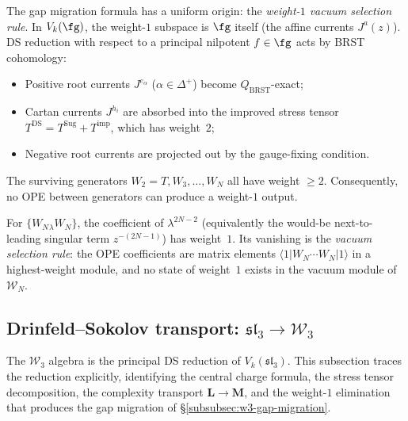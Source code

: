 \begin{remark}%
\label{rem:weight-1-vacuum-selection}%
%
%
The gap migration formula has a uniform origin: the
\emph{weight-$1$ vacuum selection rule}. In $V_k(\fg)$,
the weight-$1$ subspace is $\fg$ itself (the affine
currents $J^a(z)$). DS reduction with respect to a
principal nilpotent $f \in \fg$ acts by BRST cohomology:
\begin{itemize}
\item Positive root currents $J^{e_\alpha}$ ($\alpha \in \Delta^+$)
 become $Q_{\mathrm{BRST}}$-exact;
\item Cartan currents $J^{h_i}$ are absorbed into the
 improved stress tensor $T^{\mathrm{DS}} = T^{\mathrm{Sug}}
 + T^{\mathrm{imp}}$, which has weight~$2$;
\item Negative root currents are projected out by the
 gauge-fixing condition.
\end{itemize}
The surviving generators $W_2 = T, W_3, \ldots, W_N$
all have weight $\ge 2$. Consequently, no OPE between
generators can produce a weight-$1$ output.

For $\{W_N{}_\lambda W_N\}$, the coefficient of $\lambda^{2N-2}$
(equivalently the would-be next-to-leading singular term
$z^{-(2N-1)}$) has weight~$1$. Its
vanishing is the \emph{vacuum selection rule}: the OPE
coefficients are matrix elements $\langle 1 | W_N \cdots
W_N | 1 \rangle$ in a highest-weight module, and no
state of weight~$1$ exists in the vacuum module of
$\mathcal{W}_N$.
\end{remark}


\subsection{Drinfeld--Sokolov transport:
\texorpdfstring{$\mathfrak{sl}_3 \to \mathcal{W}_3$}{sl\_3 to W\_3}}
\label{subsec:ds-transport-sl3-w3}

The $\mathcal{W}_3$ algebra is the principal DS reduction
of $V_k(\mathfrak{sl}_3)$. This subsection traces the
reduction explicitly, identifying the central charge formula,
the stress tensor decomposition, the complexity transport
$\mathbf{L} \to \mathbf{M}$, and the weight-$1$ elimination
that produces the gap migration of
\S\ref{subsubsec:w3-gap-migration}.

